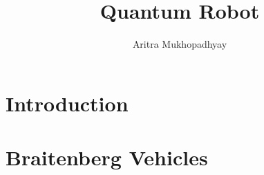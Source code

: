 \documentclass[12pt]{article}
\title{Quantum Robot}
\author{Aritra Mukhopadhyay}
\date{} %
\begin{document}
    

    

    \pagebreak
    \tableofcontents
    
    \pagebreak
    \section{Introduction}
    
    
    \section{Braitenberg Vehicles}
    
    
    
    
    
    
    
    
    
    
    
    \pagebreak %
    \listoffigures
    
    
\end{document}
